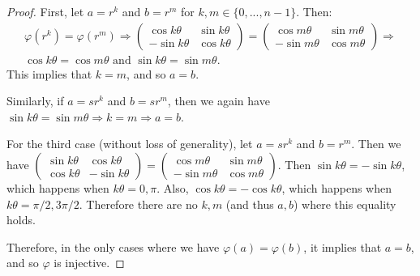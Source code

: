 \documentclass{article}
\begin{document}
\begin{enumerate}[label=(\alph*)]
\begin{proof}
            First, let $a = r^k$ and $b = r^m$ for $k, m \in \{0, ..., n - 1\}$. Then:
            \begin{multline*}
                \varphi(r^k) = \varphi(r^m) \Rightarrow \begin{pmatrix}\cos k \theta & \sin k \theta \\ -\sin k \theta & \cos k \theta\end{pmatrix} = \begin{pmatrix}\cos m \theta & \sin m \theta \\ -\sin m \theta & \cos m \theta\end{pmatrix} \Rightarrow \\ \cos k \theta = \cos m \theta \text{ and } \sin k \theta = \sin m \theta.
            \end{multline*}
            This implies that $k = m$, and so $a = b$.

            Similarly, if $a = sr^k$ and $b = sr^m$, then we again have $\sin k \theta = \sin m \theta \Rightarrow k = m \Rightarrow a = b$.

            For the third case (without loss of generality), let $a = sr^k$ and $b = r^m$. Then we have $\begin{pmatrix}\sin k \theta & \cos k \theta \\ \cos k \theta & -\sin k \theta\end{pmatrix} = \begin{pmatrix}\cos m \theta & \sin m \theta \\ -\sin m \theta & \cos m \theta\end{pmatrix}$. Then $\sin k \theta = -\sin k \theta$, which happens when $k \theta = 0, \pi$. Also, $\cos k \theta = -\cos k \theta$, which happens when $k \theta = \pi / 2, 3\pi / 2$. Therefore there are no $k, m$ (and thus $a, b$) where this equality holds.

            Therefore, in the only cases where we have $\varphi(a) = \varphi(b)$, it implies that $a = b$, and so $\varphi$ is injective.
          \end{proof}
\end{enumerate}
\end{document}
